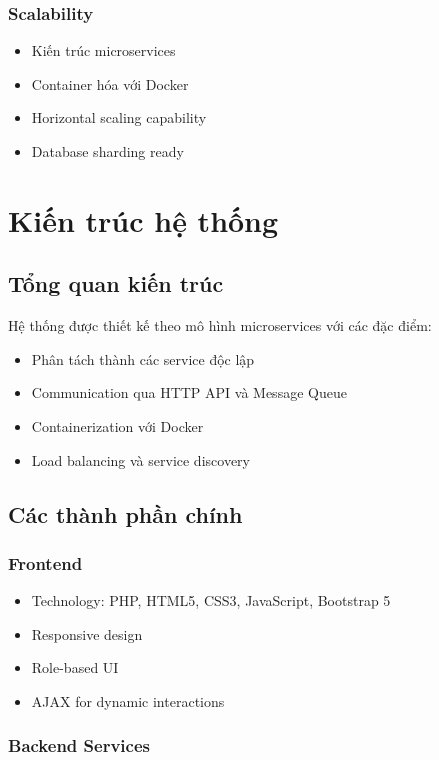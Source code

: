 \documentclass[12pt,a4paper]{report}
\begin{document}
\subsection{Scalability}
\begin{itemize}
    \item Kiến trúc microservices
    \item Container hóa với Docker
    \item Horizontal scaling capability
    \item Database sharding ready
\end{itemize}

\chapter{Kiến trúc hệ thống}

\section{Tổng quan kiến trúc}
Hệ thống được thiết kế theo mô hình microservices với các đặc điểm:
\begin{itemize}
    \item Phân tách thành các service độc lập
    \item Communication qua HTTP API và Message Queue
    \item Containerization với Docker
    \item Load balancing và service discovery
\end{itemize}

\section{Các thành phần chính}

\subsection{Frontend}
\begin{itemize}
    \item Technology: PHP, HTML5, CSS3, JavaScript, Bootstrap 5
    \item Responsive design
    \item Role-based UI
    \item AJAX for dynamic interactions
\end{itemize}

\subsection{Backend Services}
\end{document}
